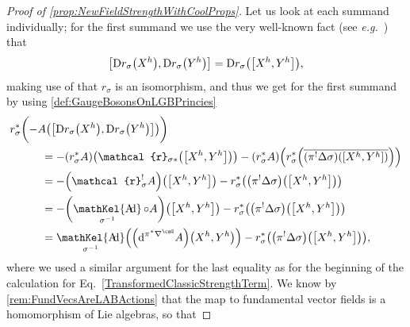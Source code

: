 \documentclass[reqno,a4paper,oneside]{amsart}
\theoremstyle{plain}
\theoremstyle{remark}
\theoremstyle{definition}
\DeclareMathOperator{\sAd}{\mathKel{A\mkern-5.5mu d}}
\begin{document}
\begin{proof}[Proof of \ref{prop:NewFieldStrengthWithCoolProps}]
Let us look at each summand individually; for the first summand we use the very well-known fact (see \textit{e.g.}\ \cite[\S A.1.11, Cor.\ A.1.51, page 615]{Hamilton}) that
\begin{equation*}
\mleft[\mathrm{D}r_\sigma\mleft( X^h \mright), \mathrm{D}r_\sigma\mleft(Y^h\mright)\mright]
=
\mathrm{D}r_\sigma\mleft(\mleft[ X^h, Y^h\mright]\mright),
\end{equation*}
making use of that $r_\sigma$ is an isomorphism, and thus we get for the first summand by using \ref{def:GaugeBosonsOnLGBPrincies}
\begin{align*}
&r_\sigma^*\biggl(
- A\mleft(
	\mleft[\mathrm{D}r_\sigma\mleft( X^h \mright), \mathrm{D}r_\sigma\mleft(Y^h\mright)\mright]
\mright)
\biggr)
\\
&\hspace{1cm}=
-\mleft( r_\sigma^*A \mright)\mleft( \mathcal{r}_{\sigma*} \mleft( \mleft[ X^h, Y^h\mright] \mright)\mright)
	- \mleft( r_\sigma^* A \mright) \mleft( r_{\sigma}^*\mleft({\overline{ \mleft(\pi^! \Delta \sigma \mright) \mleft(\mleft[ X^h, Y^h\mright]\mright)}}\mright) \mright)
\\
&\hspace{1cm}=
-\mleft( \mathcal{r}_\sigma^!A \mright)\mleft( \mleft[ X^h, Y^h\mright] \mright)
	- r_{\sigma}^*\mleft(\mleft(\pi^! \Delta \sigma \mright) \mleft(\mleft[ X^h, Y^h\mright]\mright)\mright)
\\
&\hspace{1cm}=
-\mleft( \sAd_{\sigma^{-1}} \circ A \mright)\mleft( \mleft[ X^h, Y^h\mright] \mright)
	- r_{\sigma}^*\mleft(\mleft(\pi^! \Delta \sigma \mright) \mleft(\mleft[ X^h, Y^h\mright]\mright)\mright)
\\
&\hspace{1cm}=
\sAd_{\sigma^{-1}}\mleft(\mleft( \mathrm{d}^{\pi^*\nabla^\caG}A \mright)\mleft( X^h, Y^h \mright) \mright)
	- r_{\sigma}^*\mleft(\mleft(\pi^! \Delta \sigma \mright) \mleft(\mleft[ X^h, Y^h\mright]\mright)\mright),
\end{align*}
where we used a similar argument for the last equality as for the beginning of the calculation for Eq.\ \eqref{TransformedClassicStrengthTerm}.
We know by \ref{rem:FundVecsAreLABActions} that the map to fundamental vector fields is a homomorphism of Lie algebras, so that

\end{proof}
\end{document}
